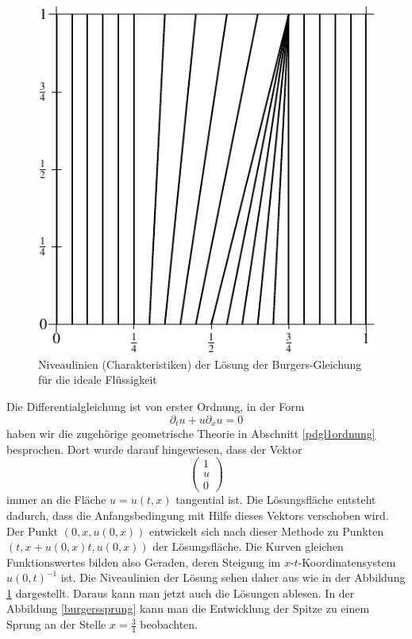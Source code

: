\begin{figure}
\begin{center}
\includegraphics[width=0.8\hsize]{../common/images/burgers-2}
\end{center}
\caption{Niveaulinien (Charakteristiken) der Lösung der Burgers-Gleichung für
die ideale Flüssigkeit\label{burgersniveau}}
\end{figure}
Die Differentialgleichung ist von erster Ordnung, in der Form
\[
\partial_tu+u\partial_xu=0
\]
haben wir die zugehörige geometrische Theorie in Abschnitt
\ref{pdgl1ordnung} besprochen. Dort wurde darauf hingewiesen,
dass der Vektor 
\[
\begin{pmatrix}
1\\u\\0
\end{pmatrix}
\]
immer an die Fläche $u=u(t,x)$ tangential ist. Die Lösungsfläche
entsteht dadurch, dass die Anfangsbedingung mit Hilfe dieses Vektors
verschoben wird. 
Der Punkt $(0,x,u(0,x))$ entwickelt sich nach dieser Methode zu
Punkten $(t,x+u(0,x)t, u(0,x))$ der Lösungsfläche. Die Kurven
gleichen Funktionswertes bilden also Geraden, deren Steigung im
$x$-$t$-Koordinatensystem $u(0,t)^{-1}$ ist. Die Niveaulinien der
Lösung sehen daher aus wie in der Abbildung \ref{burgersniveau}
dargestellt.
Daraus kann man jetzt auch die Lösungen ablesen. In der Abbildung
\ref{burgerssprung} kann man die Entwicklung der Spitze zu einem
Sprung an der Stelle $x=\frac34$ beobachten.

